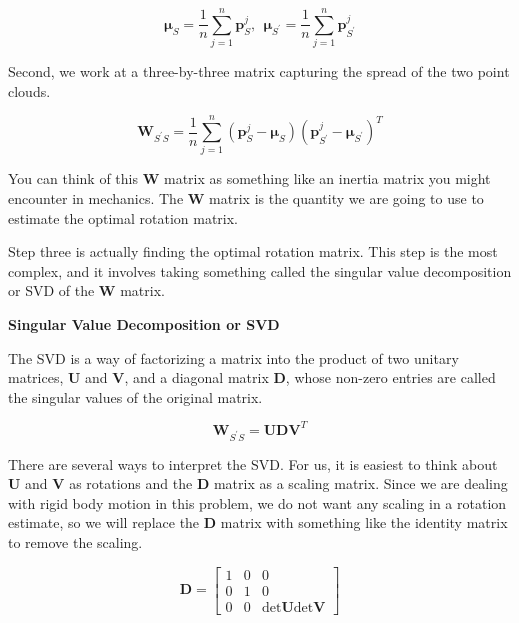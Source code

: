 \begin{equation}
\boldsymbol{\mu}_S = \frac{1}{n} \sum_{j=1}^{n} \mathbf{p}_{S}^{j}, ~~ \boldsymbol{\mu}_{S^{'}} = \frac{1}{n} \sum_{j=1}^{n} \mathbf{p}_{S^{'}}^{j}
\end{equation}

Second, we work at a three-by-three matrix capturing the spread of
the two point clouds. 

\begin{equation}
\mathbf{W}_{S^{'}S} = \frac{1}{n} \sum_{j=1}^{n} (\mathbf{p}_{S}^{j} - \boldsymbol{\mu}_S) (\mathbf{p}_{S^{'}}^{j} - \boldsymbol{\mu}_{S^{'}})^T
\end{equation}

You can think of this $\mathbf{W}$ matrix
as something like an inertia matrix you might
encounter in mechanics. The $\mathbf{W}$ matrix is the quantity
we are going to use to estimate the optimal
rotation matrix. 

Step three is actually finding the optimal rotation matrix. This step is the most complex, and it involves taking
something called the singular value decomposition
or SVD of the $\mathbf{W}$ matrix. 

\begin{framed}
\theoremstyle{remark}
\begin{remark}{\textbf{Singular Value Decomposition or SVD}}

The SVD is a way of factorizing a matrix into the product
of two unitary matrices, $\mathbf{U}$ and $\mathbf{V}$, and a diagonal matrix $\mathbf{D}$, whose non-zero entries
are called the singular values of the original matrix. 

\begin{equation}
\mathbf{W}_{S^{'}S} = \mathbf{U}\mathbf{D}\mathbf{V}^T
\end{equation}
\end{remark}
\end{framed}

There are several ways to interpret the SVD. For us, it is easiest
to think about $\mathbf{U}$ and $\mathbf{V}$ as rotations and the $\mathbf{D}$ matrix
as a scaling matrix. Since we are dealing with rigid body motion in this problem, we do not want any scaling
in a rotation estimate, so we will replace
the $\mathbf{D}$ matrix with something like the identity matrix
to remove the scaling. 

\begin{equation}
\mathbf{D} = 
\begin{bmatrix}
1 & 0 & 0 \\
0 & 1 & 0 \\
0 & 0 & \text{det}\mathbf{U}\text{det}\mathbf{V}
\end{bmatrix}
\end{equation}

